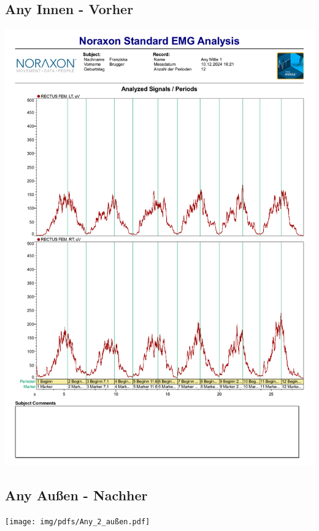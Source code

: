 \subsection*{Any Innen - Vorher}
\includegraphics[width=.9\textwidth]{img/pdfs/Any_Mitte_1.pdf}
\clearpage

\subsection*{Any Außen - Nachher}
\texttt{[image: img/pdfs/Any\_2\_außen.pdf]}
\clearpage

